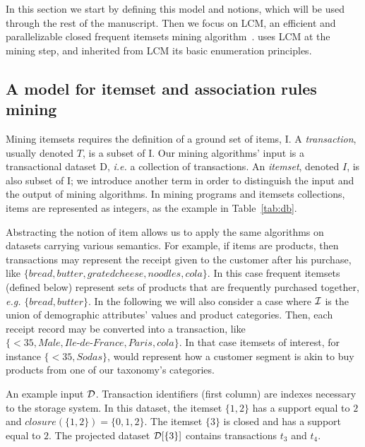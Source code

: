 In this section we start by defining this model and notions,
which will be used through the rest of the manuscript.
Then we focus on LCM, an efficient and parallelizable closed frequent itemsets mining algorithm~\cite{UnoDS04}.
\capa uses LCM at the mining step, and \toppi inherited from LCM its basic enumeration principles.



\subsection{A model for itemset and association rules mining}
\label{sec:model:mining}

Mining itemsets requires the definition of a ground set of items, {\mf I}.
A {\em transaction}, usually denoted $T$, is a subset of {\mf I}.
Our mining algorithms' input is a transactional dataset {\mf D}, {\em i.e.} a collection of transactions.
An {\em itemset}, denoted $I$, is also subset of {\mf I};
we introduce another term in order to distinguish the input and the output of mining algorithms.
In mining programs and itemsets collections, items are represented as integers,
as the example in Table~\ref{tab:db}.

Abstracting the notion of item allows us to apply the same algorithms on datasets carrying various semantics.
For example, if items are products,
then transactions may represent the receipt given to the customer after his purchase,
like $\{\mathit{bread, butter, grated cheese, noodles, cola}\}$.
In this case frequent itemsets (defined below) represent sets of products that are frequently purchased together,
{\em e.g.} $\{\mathit{bread, butter}\}$.
In the following we will also consider a case where $\cal I$ is the union of
demographic attributes' values and product categories.
Then, each receipt record may be converted into a transaction,
like  $\{\mathit{ <35, Male, \text{Ile-de-France}, Paris, cola}\}$.
In that case itemsets of interest, for instance $\{\mathit{ <35, Sodas}\}$,
would represent how a customer segment is akin to buy products from one of our taxonomy's categories.

\begin{table}
		\centering
		
		\caption{
			\label{tab:db}
			An example input ${\cal D}$.
			Transaction identifiers (first column) are indexes necessary to the storage system.
			In this dataset, the itemset $\{1,2\}$ has a support equal to $2$
			and $\mathit{closure}(\{1,2\})=\{0,1,2\}$.
			The itemset $\{3\}$ is closed and has a support equal to $2$.
			The projected dataset ${\cal D}[\{3\}]$ contains transactions $t_3$ and $t_4$.
			}
\end{table}

